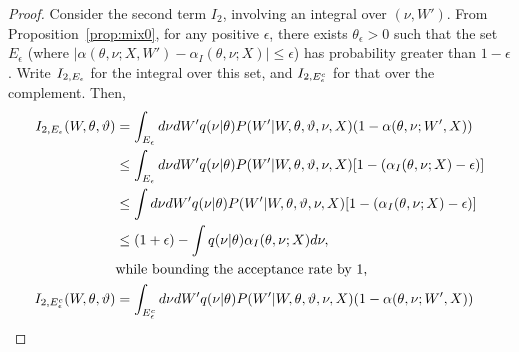 \begin{proof}
{Consider the second term $I_2$, involving an integral over $(\nu,W')$.
  From Proposition~\ref{prop:mix0}, for any positive $\epsilon$, there
  exists $\theta_\epsilon > 0$ such that the set $E_{\epsilon}$
  (where $|\alpha(\theta, \nu ; X,W') - \alpha_I(\theta, \nu ; X)| \le
  \epsilon$) has probability greater than $1-\epsilon$.
  Write $I_{2,E_{\epsilon}}$ for the integral over this set, and
  $I_{2,E_{\epsilon}^c}$ for that over the complement. Then,
}
\begin{align*}
I_{2,\E_{\epsilon}}(W, \theta, \vartheta) &= \int_{\E_{\epsilon}} d\nu  dW'q(\nu | \theta)P(W' | W, \theta, \vartheta, \nu, X)(1 - \alpha(\theta, \nu ; W', X)) \\
&\le \int_{\E_\epsilon}d\nu dW' q(\nu | \theta)
  P(W' | W, \theta, \vartheta, \nu, X)  [ 1 - (\alpha_I(\theta, \nu ; X)-\epsilon)] \\
&\le   \int d\nu dW'  q(\nu | \theta)
  P(W' | W, \theta, \vartheta, \nu, X)
  [ 1 - (\alpha_I(\theta, \nu ; X)-\epsilon)] \\
  &\le (1+\epsilon)  - \int  q(\nu | \theta) \alpha_I(\theta, \nu ; X) d\nu, \\
 & \text{while bounding the acceptance rate by 1,} \\
  I_{2,\E_{\epsilon}^c}(W, \theta, \vartheta)  &= \int_{\E^c_{\epsilon}} d\nu  dW'q(\nu | \theta)P(W' | W, \theta, \vartheta, \nu, X)(1 - \alpha(\theta, \nu ; W', X)) \\

\end{align*}
\end{proof}

